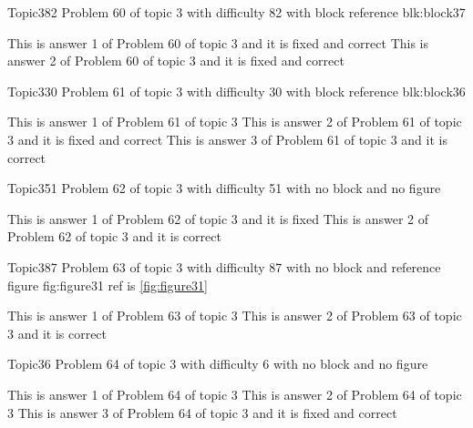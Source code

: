 \documentclass[master]{exam}
\begin{document}
\begin{problem}[requires=blk:block37]{Topic3}{82}
	Problem 60 of topic 3 with difficulty 82 with block reference blk:block37
	\begin{answers}
		 This is answer 1 of Problem 60 of topic 3 and it is fixed and correct
		 This is answer 2 of Problem 60 of topic 3 and it is fixed and correct
	\end{answers}
\end{problem}

\begin{problem}[requires=blk:block36]{Topic3}{30}
	Problem 61 of topic 3 with difficulty 30 with block reference blk:block36
	\begin{answers}
		\answer This is answer 1 of Problem 61 of topic 3 
		 This is answer 2 of Problem 61 of topic 3 and it is fixed and correct
		\answer[correct] This is answer 3 of Problem 61 of topic 3 and it is correct
	\end{answers}
\end{problem}

\begin{problem}{Topic3}{51}
	Problem 62 of topic 3 with difficulty 51 with no block and no figure
	\begin{answers}
		\answer[fixed] This is answer 1 of Problem 62 of topic 3 and it is fixed
		\answer[correct] This is answer 2 of Problem 62 of topic 3 and it is correct
	\end{answers}
\end{problem}

\begin{problem}{Topic3}{87}
	Problem 63 of topic 3 with difficulty 87 with no block and reference figure fig:figure31 ref is \ref{fig:figure31}
	\begin{answers}
		\answer This is answer 1 of Problem 63 of topic 3 
		\answer[correct] This is answer 2 of Problem 63 of topic 3 and it is correct
	\end{answers}
\end{problem}

\begin{problem}{Topic3}{6}
	Problem 64 of topic 3 with difficulty 6 with no block and no figure
	\begin{answers}
		\answer This is answer 1 of Problem 64 of topic 3 
		\answer This is answer 2 of Problem 64 of topic 3 
		 This is answer 3 of Problem 64 of topic 3 and it is fixed and correct
	\end{answers}
\end{problem}
\end{document}
